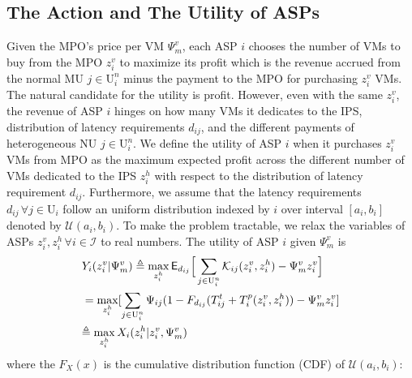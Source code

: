 \documentclass[10pt,journal, compsoc]{IEEEtran}
\begin{document}
\subsection{The Action and The Utility of ASPs}
Given the MPO's price per VM $\Psi_m^v$, each ASP $i$ chooses the number of VMs to buy from the MPO $z_i^v$ to maximize its profit which is the revenue accrued from the normal MU $j \in \mathrm{U}_i^n$ minus the payment to the MPO for purchasing $z_i^v$ VMs. The natural candidate for the utility is profit. However, even with the same $z_i^v$, the revenue of ASP $i$ hinges on how many VMs it dedicates to the IPS, distribution of latency requirements $d_{ij}$, and the different payments of heterogeneous NU $j \in \mathrm{U}_i^n$. We define the utility of ASP $i$ when it purchases $z_i^v$ VMs from MPO as the maximum expected profit across the different number of VMs dedicated to the IPS $z_i^h$ with respect to the distribution of latency requirement $d_{ij}$. Furthermore, we assume that the latency requirements $d_{ij} \, \forall j \in \mathrm{U}_i$ follow an uniform distribution indexed by $i$ over interval $[a_i, b_i]$ denoted by $\mathcal{U}(a_i,b_i)$. To make the problem tractable, we relax the variables of ASPs $z_i^v, z_i^h \, \forall i \in \mathcal{I}$ to real numbers. The utility of ASP $i$ given $\Psi_m^v$ is
\begin{align}
&Y_i(z_i^v|\Psi_m^v) \triangleq \max_{z_i^h} \mathsf{E}_{d_{ij}}\Big[\sum_{j \in \mathrm{U}_i^n} \mathcal{K}_{ij}(z_i^v, z_i^h) - \Psi_m^v z_i^v\Big] 
\hspace*{-1mm}
\iffalse=\max_{z_i^h} \mathsf{E}_{d_{ij}}[\sum_{j \in \mathrm{U}_i^n}\Psi_{ij}\mathds{1}\{T_{ij}^t + T_i^p(z_i^v, z_i^h) \leq d_{ij}\} - \Psi_m^vz_i^v] \nonumber \fi\\
\hspace*{-1mm}&=\max_{z_i^h} [\sum_{j \in \mathrm{U}_i^n}\Psi_{ij}(1-F_{d_{ij}}(T_{ij}^t+T_i^p(z_i^v, z_i^h)) - \Psi_m^vz_i^v] \\ %
&\hspace*{-1mm}\triangleq \max_{z_i^h} X_i(z_i^h|z_i^v,\Psi_m^v) \label{eqn:asp_def_subobjective}
\end{align}
where the $F_{X}(x)$ is the cumulative distribution function (CDF) of $\mathcal{U}(a_i,b_i)$:
\end{document}
